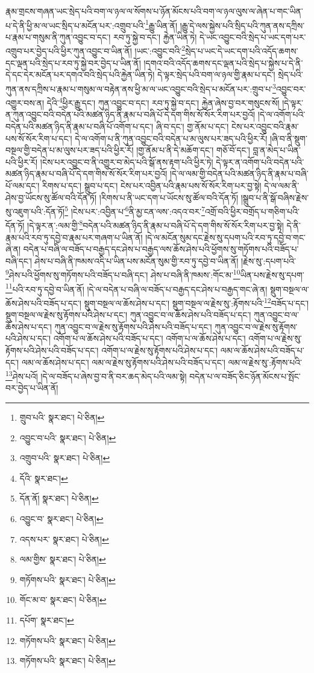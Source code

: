 རྣམ་གྲངས་གཞན་ཡང་སྲེད་པའི་བག་ལ་ཉལ་ལ་སོགས་པ་ཉོན་མོངས་པའི་བག་ལ་ཉལ་ལུས་ལ་ཞེན་པ་གང་ཡིན་པ་དེ་ནི་ཕྱི་མ་ལ་ཡང་སྲིད་པ་མངོན་པར་:འགྲུབ་པའི་\footnote{གྲུབ་པའི་  སྣར་ཐང་།  པེ་ཅིན། }རྒྱུ་ཡིན་ནོ། །རྒྱུ་དེ་ལས་སྐྱེས་པའི་སྲིད་པའི་ཀུན་ནས་དཀྲིས་པ་རྣམ་པ་གསུམ་ནི་ཀུན་འབྱུང་བ་དང་། རབ་ཏུ་སྐྱེ་བ་དང་། རྐྱེན་ཡིན་ཏེ། དེ་ཡང་འབྱུང་བའི་སྲེད་པ་ཡང་དག་པར་འགྲུབ་པར་བྱེད་པའི་ཕྱིར་ཀུན་འབྱུང་བ་ཡིན་ནོ། །ཡང་:འབྱུང་བའི་\footnote{འབྱུང་བ་པའི་  སྣར་ཐང་།  པེ་ཅིན། }སྲེད་པ་ཡང་དེ་ཡང་དག་པའི་འདོད་ཆགས་དང་ལྡན་པའི་སྲེད་པ་རབ་ཏུ་སྐྱེ་བར་བྱེད་པ་ཡིན་ནོ། །དགའ་བའི་འདོད་ཆགས་དང་ལྡན་པའི་སྲེད་པ་སྐྱེས་པ་དེ་ནི་དེ་དང་དེར་མངོན་པར་དགའ་བའི་སྲེད་པའི་རྐྱེན་ཡིན་ཏེ། དེ་ལྟར་སྲེད་པའི་བག་ལ་ཉལ་གྱི་རྣམ་པ་དང་། སྲེད་པའི་ཀུན་ནས་དཀྲིས་པ་རྣམ་པ་གསུམ་ལ་བརྟེན་ནས་ཕྱི་མ་ལ་ཡང་འབྱུང་བའི་སྲེད་པ་མངོན་པར་:གྲུབ་པ་\footnote{འགྲུབ་པའི་  སྣར་ཐང་།  པེ་ཅིན། }འབྱུང་བར་འགྱུར་བས་ན། དེའི་\footnote{དོའི་  སྣར་ཐང་། }ཕྱིར་རྒྱུ་དང་། ཀུན་འབྱུང་བ་དང་། རབ་ཏུ་སྐྱེ་བ་དང་། རྐྱེན་ཞེས་བྱ་བར་གསུངས་སོ། །དེ་ལྟར་ན་ཀུན་འབྱུང་བའི་བདེན་པའི་མཚན་ཉིད་ནི་རྣམ་པ་བཞི་པོ་དེ་དག་གིས་སོ་སོར་རིག་པར་བྱའོ། །དེ་ལ་འགོག་པའི་བདེན་པའི་མཚན་ཉིད་ནི་རྣམ་པ་བཞི་པོ་འགོག་པ་དང་། ཞི་བ་དང་། གྱ་ནོམ་པ་དང་། ངེས་པར་འབྱུང་བའི་རྣམ་པས་སོ་སོར་རིག་པ་དང་། དེ་ལ་འགོག་པ་ནི་ཀུན་འབྱུང་བའི་བདེན་པ་མ་ལུས་པར་ཟད་པའི་ཕྱིར་རོ། །ཞི་བ་ནི་སྡུག་བསྔལ་གྱི་བདེན་པ་མ་ལུས་པར་ཟད་པའི་ཕྱིར་རོ། །གྱ་ནོམ་པ་ནི་དེ་མཆོག་དང་། གཅོ་བོ་དང་། བླ་ན་མེད་པ་ཡིན་པའི་ཕྱིར་རོ། །ངེས་པར་འབྱུང་བ་ནི་འགྱུར་བ་མེད་པའི་སྒོ་ནས་རྟག་པའི་ཕྱིར་ཏེ། དེ་ལྟར་ན་འགོག་པའི་བདེན་པའི་མཚན་ཉིད་རྣམ་པ་བཞི་པོ་དེ་དག་གིས་སོ་སོར་རིག་པར་བྱའོ། །དེ་ལ་ལམ་གྱི་བདེན་པའི་མཚན་ཉིད་ནི་རྣམ་པ་བཞི་པོ་ལམ་དང་། རིགས་པ་དང་། སྒྲུབ་པ་དང་། ངེས་པར་འབྱིན་པའི་རྣམ་པས་སོ་སོར་རིག་པར་བྱ་སྟེ། དེ་ལ་ལམ་ནི་ཤེས་བྱ་ཡོངས་སུ་ཚོལ་བའི་དོན་ཏོ། །རིགས་པ་ནི་ཡང་དག་པ་ཡོངས་སུ་ཚོལ་བའི་དོན་ཏོ། །སྒྲུབ་པ་ནི་སྒོ་བཞིས་རྗེས་སུ་འཇུག་པའི་:དོན་ཏོ།\footnote{དོན་ནོ།  སྣར་ཐང་།  པེ་ཅིན། } །ངེས་པར་:འབྱིན་པ་\footnote{འབྱུང་བ་  སྣར་ཐང་།  པེ་ཅིན། }ནི་མྱ་ངན་ལས་:འདའ་བར་\footnote{འདས་པར་  སྣར་ཐང་།  པེ་ཅིན། }འགྲོ་བའི་ཕྱིར་བགྲོད་པ་གཅིག་པའི་དོན་ཏོ། །དེ་ལྟར་ན་:ལམ་གྱི་\footnote{ལམ་གྱིས་  སྣར་ཐང་།  པེ་ཅིན། }བདེན་པའི་མཚན་ཉིད་ནི་རྣམ་པ་བཞི་པོ་དེ་དག་གིས་སོ་སོར་རིག་པར་བྱ་སྟེ། དེ་ནི་རྣམ་པའི་རབ་ཏུ་དབྱེ་བ་རྣམ་པར་གཞག་པ་ཡིན་ནོ། །དེ་ལ་མངོན་སུམ་དང་རྗེས་སུ་དཔག་པའི་རབ་ཏུ་དབྱེ་བ་གང་ཞེ་ན། བདེན་པ་བཞི་ལ་བཟོད་པ་བརྒྱད་དང་ཤེས་པ་བརྒྱད་ལས་ཆོས་ཤེས་པའི་ཕྱོགས་སུ་གཏོགས་པའི་བཟོད་པ་བཞི་དང་། ཤེས་པ་བཞི་ནི་ཁམས་འདི་པ་ཡིན་པས་མངོན་སུམ་གྱི་རབ་ཏུ་དབྱེ་བ་ཡིན་ནོ། །རྗེས་སུ་:དཔག་པའི་\footnote{གཏོགས་པའི་  སྣར་ཐང་།  པེ་ཅིན། }ཤེས་པའི་ཕྱོགས་སུ་གཏོགས་པའི་བཟོད་པ་བཞི་དང་། ཤེས་པ་བཞི་ནི་ཁམས་:གོང་མ་\footnote{གོང་མ་བ་  སྣར་ཐང་།  པེ་ཅིན། }ཡིན་པས་རྗེས་སུ་དཔག་\footnote{དཔོག་  སྣར་ཐང་། }པའི་རབ་ཏུ་དབྱེ་བ་ཡིན་ནོ། །དེ་ལ་བདེན་པ་བཞི་ལ་བཟོད་པ་བརྒྱད་དང་ཤེས་པ་བརྒྱད་གང་ཞེ་ན། སྡུག་བསྔལ་ལ་ཆོས་ཤེས་པའི་བཟོད་པ་དང་། སྡུག་བསྔལ་ལ་ཆོས་ཤེས་པ་དང་། སྡུག་བསྔལ་ལ་རྗེས་སུ་:རྟོགས་པའི་\footnote{གཏོགས་པའི་  སྣར་ཐང་།  པེ་ཅིན། }བཟོད་པ་དང་། སྡུག་བསྔལ་ལ་རྗེས་སུ་རྟོགས་པའི་ཤེས་པ་དང་། ཀུན་འབྱུང་བ་ལ་ཆོས་ཤེས་པའི་བཟོད་པ་དང་། ཀུན་འབྱུང་བ་ལ་ཆོས་ཤེས་པ་དང་། ཀུན་འབྱུང་བ་ལ་རྗེས་སུ་རྟོགས་པའི་ཤེས་པའི་བཟོད་པ་དང་། ཀུན་འབྱུང་བ་ལ་རྗེས་སུ་རྟོགས་པའི་ཤེས་པ་དང་། འགོག་པ་ལ་ཆོས་ཤེས་པའི་བཟོད་པ་དང་། འགོག་པ་ལ་ཆོས་ཤེས་པ་དང་། འགོག་པ་ལ་རྗེས་སུ་རྟོགས་པའི་ཤེས་པའི་བཟོད་པ་དང་། འགོག་པ་ལ་རྗེས་སུ་རྟོགས་པའི་ཤེས་པ་དང་། ལམ་ལ་ཆོས་ཤེས་པའི་བཟོད་པ་དང་། ལམ་ལ་ཆོས་ཤེས་པ་དང་། ལམ་ལ་རྗེས་སུ་རྟོགས་པའི་ཤེས་པའི་བཟོད་པ་དང་། ལམ་ལ་རྗེས་སུ་:རྟོགས་པའི་\footnote{གཏོགས་པའི་  སྣར་ཐང་།  པེ་ཅིན། }ཤེས་པའོ། །དེ་ལ་བཟོད་པ་ཞེས་བྱ་བ་ནི་བར་ཆད་མེད་པའི་ལམ་སྟེ། བདེན་པ་ལ་བཟོད་ཅིང་ཉོན་མོངས་པ་སྤོང་བར་བྱེད་པ་ཡིན་ནོ། 